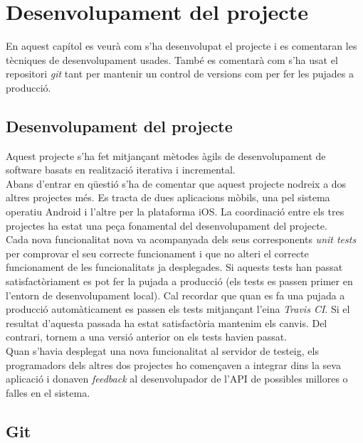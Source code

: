 \chapter{Desenvolupament del projecte}\label{desenvolupament}

En aquest capítol es veurà com s'ha desenvolupat el projecte i es comentaran les tècniques de desenvolupament usades. També es comentarà com s'ha usat el repositori \emph{git} tant per mantenir un control de versions com per fer les pujades a producció.

\section{Desenvolupament del projecte}
Aquest projecte s'ha fet mitjançant mètodes àgils de desenvolupament de software basats en realització iterativa i incremental.\\

Abans d'entrar en qüestió s'ha de comentar que aquest projecte nodreix a dos altres projectes més. Es tracta de dues aplicacions mòbils, una pel sistema operatiu Android i l'altre per la plataforma iOS. La coordinació entre els tres projectes ha estat una peça fonamental del desenvolupament del projecte.\\

Cada nova funcionalitat nova va acompanyada dels seus corresponents \emph{unit tests} per comprovar el seu correcte funcionament i que no alteri el correcte funcionament de les funcionalitats ja desplegades. Si aquests tests han passat satisfactòriament es pot fer la pujada a producció (els tests es passen primer en l'entorn de desenvolupament local). Cal recordar que quan es fa una pujada a producció automàticament es passen els tests mitjançant l'eina \emph{Travis CI}. Si el resultat d'aquesta passada ha estat satisfactòria mantenim els canvis. Del contrari, tornem a una versió anterior on els tests havien passat.\\

Quan s'havia desplegat una nova funcionalitat al servidor de testeig, els programadors dels altres dos projectes ho començaven a integrar dins la seva aplicació i donaven \emph{feedback} al desenvolupador de l'\ac{API} de possibles millores o falles en el sistema.

\section{Git}

